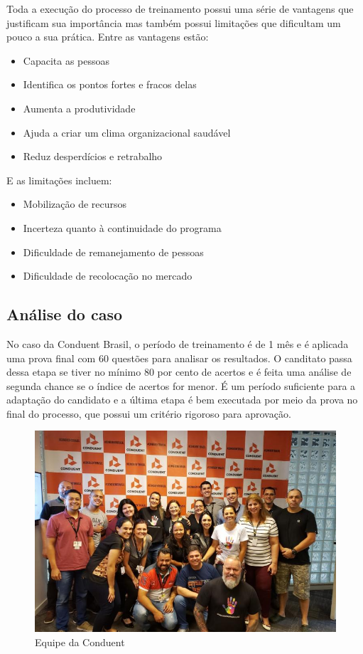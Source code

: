 \documentclass[12pt]{article}
\begin{document}
Toda a execução do processo de treinamento possui uma série de vantagens que justificam sua importância mas também possui limitações que dificultam um pouco a sua prática. 
Entre as vantagens estão:

\begin{itemize}

\item Capacita as pessoas
\item Identifica os pontos fortes e fracos delas
\item Aumenta a produtividade
\item Ajuda a criar um clima organizacional saudável
\item Reduz desperdícios e retrabalho

\end{itemize}

E as limitações incluem:

\begin{itemize}

\item Mobilização de recursos
\item Incerteza quanto à continuidade do programa
\item Dificuldade de remanejamento de pessoas
\item Dificuldade de recolocação no mercado

\end{itemize}

\subsection{Análise do caso}

No caso da Conduent Brasil, o período de treinamento é de 1 mês e é aplicada uma prova final com 60 questões para analisar os resultados. O canditato passa dessa etapa se tiver no mínimo 80 por cento de acertos e é feita uma análise de segunda chance se o índice de acertos for menor. É um período suficiente para a adaptação do candidato e a última etapa é bem executada por meio da prova no final do processo, que possui um critério rigoroso para aprovação.

\begin{figure}[h]
	\centering
	\includegraphics[width=1.0\textwidth]{build/images/mama}
	\caption{Equipe da Conduent}
	\label{fig:mesh1}
\end{figure}
\newpage
\end{document}
